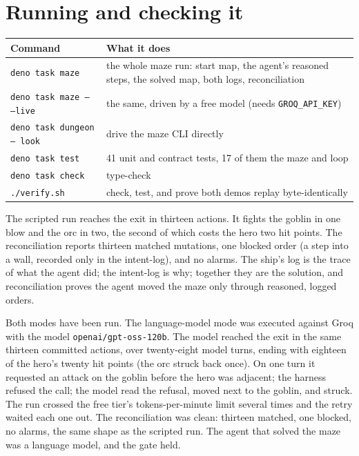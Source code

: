 \documentclass[11pt]{article}
\newcommand{\code}[1]{\texttt{#1}}
\begin{document}
\section{Running and checking it}

\begin{center}
\begin{tabularx}{\linewidth}{@{}l X@{}}
\toprule
\textbf{Command} & \textbf{What it does} \\
\midrule
\code{deno task maze} & the whole maze run: start map, the agent's reasoned steps, the solved map, both logs, reconciliation \\
\code{deno task maze -- --live} & the same, driven by a free model (needs \code{GROQ\_API\_KEY}) \\
\code{deno task dungeon -- look} & drive the maze CLI directly \\
\code{deno task test} & 41 unit and contract tests, 17 of them the maze and loop \\
\code{deno task check} & type-check \\
\code{./verify.sh} & check, test, and prove both demos replay byte-identically \\
\bottomrule
\end{tabularx}
\end{center}

The scripted run reaches the exit in thirteen actions. It fights the goblin in one
blow and the orc in two, the second of which costs the hero two hit points. The
reconciliation reports thirteen matched mutations, one blocked order (a step into
a wall, recorded only in the intent-log), and no alarms. The ship's log is the
trace of what the agent did; the intent-log is why; together they are the
solution, and reconciliation proves the agent moved the maze only through
reasoned, logged orders.

Both modes have been run. The language-model mode was executed against Groq with
the model \code{openai/gpt-oss-120b}. The model reached the exit in the same
thirteen committed actions, over twenty-eight model turns, ending with eighteen
of the hero's twenty hit points (the orc struck back once). On one turn it
requested an attack on the goblin before the hero was adjacent; the harness
refused the call; the model read the refusal, moved next to the goblin, and
struck. The run crossed the free tier's tokens-per-minute limit several times and
the retry waited each one out. The reconciliation was clean: thirteen matched, one
blocked, no alarms, the same shape as the scripted run. The agent that solved the
maze was a language model, and the gate held.
\end{document}
